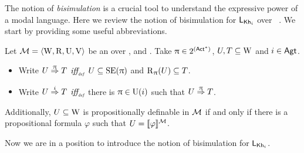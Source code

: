 \medskip 

The notion of \emph{bisimulation} is a crucial tool to understand the expressive power of a modal language. Here we review the notion of bisimulation for $\mathsf{L}_{{\sf Kh}_i}$ over \ultss~\cite{AFSVQ23report}. We start by providing some useful abbreviations.

\medskip

\begin{definition}\label{def:notation}
Let $\mathcal{M}=\langle \operatorname{W},\operatorname{R},\operatorname{U},\operatorname{V} \rangle$ be an \ults over \PROP, \ACT and \AGT. Take $\uppi \in 2^{({\rm \sf Act}^*)}$, $U, T \subseteq \operatorname{W}$ and $i \in {\rm \sf Agt}$.
\begin{itemize} \itemsep 0pt
    \item Write $U \stackrel{\uppi}{\Rightarrow} T$ $\mbox{\it iff}_{\mbox{\tiny\it def}}$ $U \subseteq \operatorname{SE}(\uppi)$ and $\operatorname{R}_{\uppi}(U) \subseteq T$.

    \item Write $U \stackrel{i}{\Rightarrow} T$ $\mbox{\it iff}_{\mbox{\tiny\it def}}$ there is $\uppi \in \operatorname{U}(i)$ such that $U \stackrel{\uppi}{\Rightarrow} T$.
\end{itemize}
Additionally, $U \subseteq \operatorname{W}$ is propositionally definable in $\mathcal{M}$ if and only if there is a propositional formula $\varphi$ such that $U = \llbracket \varphi \rrbracket^{\mathcal{M}}$.
\end{definition}

\medskip

Now we are in a position to introduce the notion of bisimulation for $\mathsf{L}_{{\sf Kh}_i}$. 

\medskip 


